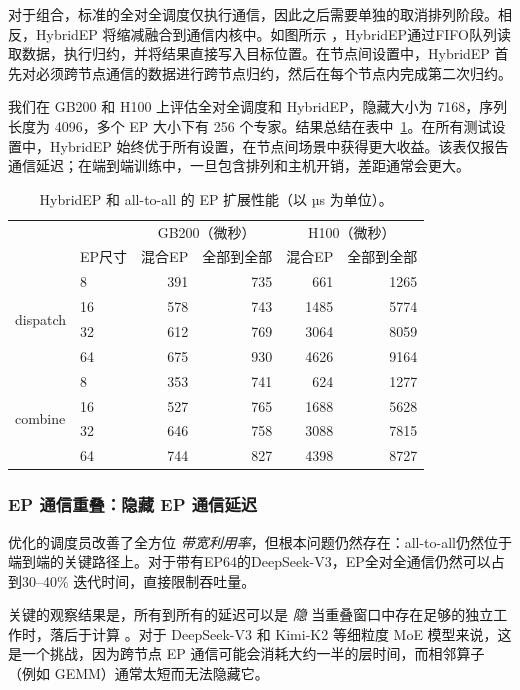 对于组合，标准的全对全调度仅执行通信，因此之后需要单独的取消排列阶段。相反，HybridEP 将缩减融合到通信内核中。如图所示 ，HybridEP通过FIFO队列读取数据，执行归约，并将结果直接写入目标位置。在节点间设置中，HybridEP 首先对必须跨节点通信的数据进行跨节点归约，然后在每个节点内完成第二次归约。


我们在 GB200 和 H100 上评估全对全调度和 HybridEP，隐藏大小为 7168，序列长度为 4096，多个 EP 大小下有 256 个专家。结果总结在表中~\ref{tab:hybrid-ep}。在所有测试设置中，HybridEP 始终优于所有设置，在节点间场景中获得更大收益。该表仅报告通信延迟；在端到端训练中，一旦包含排列和主机开销，差距通常会更大。

\begin{table}[ht]
\centering
\caption{HybridEP 和 all-to-all 的 EP 扩展性能（以 µs 为单位）。}
\label{tab:hybrid-ep}
\begin{tabular}{llrrrr}
\toprule
 &  & \multicolumn{2}{c}{GB200（微秒）} & \multicolumn{2}{c}{H100（微秒）} \\
 & EP尺寸 & 混合EP & 全部到全部 & 混合EP & 全部到全部 \\
\midrule
\multirow{4}{*}{dispatch}
 & 8  & 391 & 735 & 661  & 1265 \\
 & 16 & 578 & 743 & 1485 & 5774 \\
 & 32 & 612 & 769 & 3064 & 8059 \\
 & 64 & 675 & 930 & 4626 & 9164 \\
\midrule
\multirow{4}{*}{combine}
 & 8  & 353 & 741 & 624  & 1277 \\
 & 16 & 527 & 765 & 1688 & 5628 \\
 & 32 & 646 & 758 & 3088 & 7815 \\
 & 64 & 744 & 827 & 4398 & 8727 \\
\bottomrule
\end{tabular}
\end{table}



\subsubsection{EP 通信重叠：隐藏 EP 通信延迟}\label{sec:comm-overlap}

优化的调度员改善了全方位 \textit{带宽利用率}，但根本问题仍然存在：all-to-all仍然位于端到端的关键路径上。对于带有EP64的DeepSeek-V3，EP全对全通信仍然可以占到30--40\% 迭代时间，直接限制吞吐量。

关键的观察结果是，所有到所有的延迟可以是 \textit{隐} 当重叠窗口中存在足够的独立工作时，落后于计算 \cite{wang2022coconet,wang2024flux}。对于 DeepSeek-V3 和 Kimi-K2 等细粒度 MoE 模型来说，这是一个挑战，因为跨节点 EP 通信可能会消耗大约一半的层时间，而相邻算子（例如 GEMM）通常太短而无法隐藏它。

